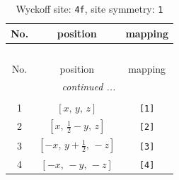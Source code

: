 \documentclass[fleqn,8pt]{jsarticle}
\begin{document}
\renewcommand{\arraystretch}{1.2}
\begin{longtable}{ccc}
\caption{Wyckoff site: {\tt 4f}, site symmetry: {\tt 1}}
 \\
 \hline \hline
No. & position & mapping \\ \hline \endfirsthead

\multicolumn{2}{l}{\tablename\ \thetable{}} \\
 \hline \hline
No. & position & mapping \\ \hline \endhead

 \hline \hline
\multicolumn{2}{r}{\footnotesize\it continued ...} \\ \endfoot

 \hline \hline
\multicolumn{2}{r}{} \\ \endlastfoot

1 & $\left[ x,\, y,\, z \right]$ & {\tt [1]} \\ \hline
2 & $\left[ x,\, \frac{1}{2} - y,\, z \right]$ & {\tt [2]} \\ \hline
3 & $\left[ - x,\, y + \frac{1}{2},\, - z \right]$ & {\tt [3]} \\ \hline
4 & $\left[ - x,\, - y,\, - z \right]$ & {\tt [4]} \\
\end{longtable}
\end{document}
